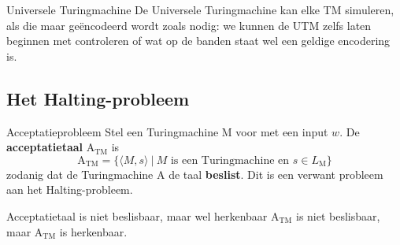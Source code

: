 \begin{theo}{Universele Turingmachine}
    De Universele Turingmachine kan elke TM simuleren, als die maar geëncodeerd wordt zoals nodig: we kunnen de UTM zelfs laten beginnen met controleren of wat op de banden staat wel een geldige encodering is.
\end{theo}

\subsection{Het Halting-probleem}

\vspace{0.5cm}

\begin{theo}[Acceptatieprobleem]{Acceptatieprobleem}
    Stel een Turingmachine M voor met een input $w$. De \textbf{acceptatietaal} A$_{\text{TM}}$ is 
    \begin{equation*}
        \text{A}_{\text{TM}} = \{ \langle M,s \rangle \ | \ M \text{ is een Turingmachine en } s \in L_{\text{M}} \}
    \end{equation*}
    zodanig dat de Turingmachine A de taal \textbf{beslist}. Dit is een verwant probleem aan het Halting-probleem.
    \vspace{-0.5cm}
\end{theo}

\begin{lem}{Acceptatietaal is niet beslisbaar, maar wel herkenbaar}
    A$_{\text{TM}}$ is niet beslisbaar, maar A$_{\text{TM}}$ is herkenbaar.
\end{lem}

